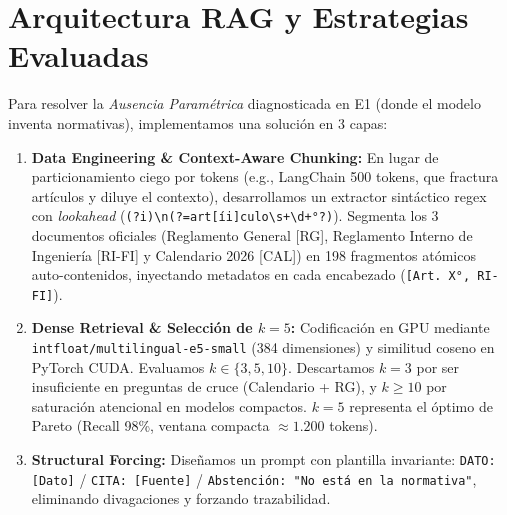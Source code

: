 \documentclass[10pt,twocolumn,letterpaper]{article}
\begin{document}
\section{Arquitectura RAG y Estrategias Evaluadas}
Para resolver la \textit{Ausencia Paramétrica} diagnosticada en E1 (donde el modelo inventa normativas), implementamos una solución en 3 capas:
\begin{enumerate}[leftmargin=*,noitemsep,topsep=1pt]
    \item \textbf{Data Engineering \& Context-Aware Chunking:} En lugar de particionamiento ciego por tokens (e.g., LangChain 500 tokens, que fractura artículos y diluye el contexto), desarrollamos un extractor sintáctico regex con \textit{lookahead} (\texttt{(?i)\textbackslash n(?=art[íi]culo\textbackslash s+\textbackslash d+°?)}). Segmenta los 3 documentos oficiales (Reglamento General [RG], Reglamento Interno de Ingeniería [RI-FI] y Calendario 2026 [CAL]) en 198 fragmentos atómicos auto-contenidos, inyectando metadatos en cada encabezado (\texttt{[Art. X°, RI-FI]}).
    \item \textbf{Dense Retrieval \& Selección de $k=5$:} Codificación en GPU mediante \texttt{intfloat/multilingual-e5-small} (384 dimensiones) y similitud coseno en PyTorch CUDA. Evaluamos $k \in \{3, 5, 10\}$. Descartamos $k=3$ por ser insuficiente en preguntas de cruce (Calendario + RG), y $k \ge 10$ por saturación atencional en modelos compactos. $k=5$ representa el óptimo de Pareto (Recall 98\%, ventana compacta $\approx 1.200$ tokens).
    \item \textbf{Structural Forcing:} Diseñamos un prompt con plantilla invariante: \texttt{DATO: [Dato]} / \texttt{CITA: [Fuente]} / \texttt{Abstención: "No está en la normativa"}, eliminando divagaciones y forzando trazabilidad.
\end{enumerate}
\end{document}
